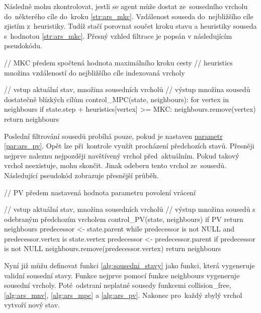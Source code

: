 Následně mohu zkontrolovat, jestli se agent může dostat ze~sousedního vrcholu
do~některého cíle do~kroku \ref{str:ars_mkc}.
Vzdálenost souseda do~nejbližšího cíle zjistím z~heuristiky.
Tudíž stačí porovnat součet kroku stavu a heuristiky souseda s~hodnotou \ref{str:ars_mkc}.
Přesný vzhled filtrace je popsán v následujícím pseudokódu.

\begin{code}[fontsize=\footnotesize]
// MKC předem spočtená hodnota maximálního kroku cesty
// heuristics množina vzdáleností do nejbližšího cíle indexovaná vrcholy

// vstup aktuální stav, množina sousedních vrcholů
// výstup množina sousedů dostatečně blízkých cílům
control_MPC(state, neighbours):
  for vertex in neighbours
    if state.step + heuristics[vertex] >= MKC:
      neighbours.remove(vertex)
  return neighbours
\end{code}

Poslední filtrování sousedů probíhá pouze, pokud je nastaven
\hyperref[subsubsec:ars_parametry]{parametr} \ref{par:ars_pv}.
Opět lze při~kontrole využít procházení předchozích stavů.
Přesněji nejprve naleznu nejpozději navštívený vrchol před~aktuálním.
Pokud takový vrchol neexistuje, mohu skončit.
Jinak odeberu tento vrchol ze~sousedů.
Následující pseudokód zobrazuje přesnější průběh.

\begin{code}[fontsize=\footnotesize]
// PV předem nastavená hodnota parametru povolení vrácení

// vstup aktuální stav, množina sousedních vrcholů
// výstup množina sousedů s odebraným předchozím vrcholem
control_PV(state, neighbours)
  if PV
    return neighbours
  predecessor <- state.parent
  while predecessor is not NULL and predecessor.vertex is state.vertex
    predecessor <- predecessor.parent
  if predecessor is not NULL
    neighbours.remove(predecessor.vertex)
  return neighbours
\end{code}

Nyní již můžu definovat funkci \ref{alg:sousedni_stavy} jako funkci, která vygeneruje validní sousední stavy.
Funkce nejprve pomocí funkce \textrm{neighbours} vygeneruje sousední vrcholy.
Poté~odstraní neplatné sousedy funkcemi \textrm{collision\_free},
\ref{alg:ars_mnv}, \ref{alg:ars_mpc} a \ref{alg:ars_pv}.
Nakonec pro~každý zbylý vrchol vytvoří nový stav.


